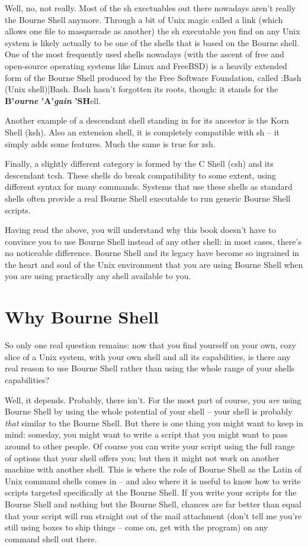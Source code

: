 Well, no, not really. Most of the sh exectuables out there nowadays aren't
really the Bourne Shell anymore. Through a bit of Unix magic called a link
(which allows one file to masquerade as another) the sh executable you find on
any Unix system is likely actually to be one of the shells that is based on the
Bourne shell. One of the most frequently used shells nowadays (with the ascent
of free and open-source operating systems like Linux and FreeBSD) is a heavily
extended form of the Bourne Shell produced by the Free Software Foundation,
called :Bash (Unix shell)|Bash. Bash hasn't forgotten its roots, though: it
stands for the \textbf{B'\textit{ourne }'A'\textit{gain }'SH}ell.

Another example of a descendant shell standing in for its ancestor is the Korn
Shell (ksh). Also an extension shell, it is completely compatible with sh -- it
simply adds some features. Much the same is true for zsh.

Finally, a slightly different category is formed by the C Shell (csh) and its
descendant tcsh. These shells do break compatibility to some extent, using
different syntax for many commands. Systems that use these shells as standard
shells often provide a real Bourne Shell executable to run generic Bourne Shell
scripts.

Having read the above, you will understand why this book doesn't have to
convince you to use Bourne Shell instead of any other shell: in most cases,
there's no noticeable difference. Bourne Shell and its legacy have become so
ingrained in the heart and soul of the Unix environment that you are using
Bourne Shell when you are using practically any shell available to you.

\section{Why Bourne Shell} 
So only one real question remains: now that you find yourself on your own, cozy
slice of a Unix system, with your own shell and all its capabilities, is there
any real reason to use Bourne Shell rather than using the whole range of your
shells capabilities?

Well, it depends. Probably, there isn't. For the most part of course, you
\textit{are} using Bourne Shell by using the whole potential of your shell --
your shell is probably \textit{that} similar to the Bourne Shell. But there is
one thing you might want to keep in mind: someday, you might want to write a
script that you might want to pass around to other people. Of course you can
write your script using the full range of options that your shell offers you;
but then it might not work on another machine with another shell. This is where
the role of Bourne Shell as the Latin of Unix command shells comes in -- and
also where it is useful to know how to write scripts targeted specifically at
the Bourne Shell. If you write your scripts for the Bourne Shell and nothing
but the Bourne Shell, chances are far better than equal that your script will
run straight out of the mail attachment (don't tell me you're still using boxes
to ship things -- come on, get with the program) on any command shell out
there.

